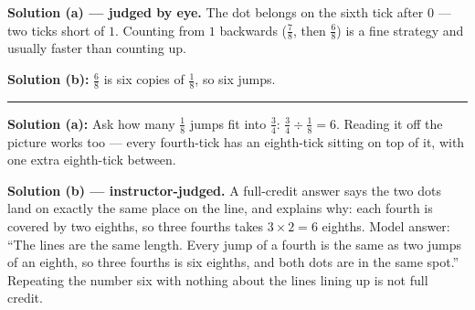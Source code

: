 \documentclass[12pt]{article}
\begin{document}

\textbf{Solution (a) --- judged by eye.} The dot belongs on the sixth tick after $0$ --- two ticks
short of $1$. Counting from $1$ backwards ($\frac{7}{8}$, then $\frac{6}{8}$) is a fine strategy and
usually faster than counting up.

\textbf{Solution (b):} $\frac{6}{8}$ is six copies of $\frac{1}{8}$, so six jumps. 

\vspace{0.15cm}\noindent\rule{\linewidth}{0.2pt}


\textbf{Solution (a):} Ask how many $\frac{1}{8}$ jumps fit into $\frac{3}{4}$:
$\frac{3}{4} \div \frac{1}{8} = 6$. Reading it off the picture works too --- every fourth-tick has an
eighth-tick sitting on top of it, with one extra eighth-tick between. 

\textbf{Solution (b) --- instructor-judged.} A full-credit answer says the two dots land on exactly the
same place on the line, and explains why: each fourth is covered by two eighths, so three fourths
takes $3 \times 2 = 6$ eighths. Model answer: ``The lines are the same length. Every jump of a fourth
is the same as two jumps of an eighth, so three fourths is six eighths, and both dots are in the same
spot.'' Repeating the number six with nothing about the lines lining up is not full credit.
\end{document}
